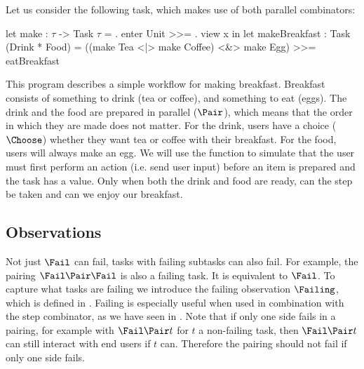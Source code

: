   Let us consider the following task, which makes use of both parallel combinators:
  \begin{TASK}
    let make : $\tau$ -> Task $\tau$ = \x. enter Unit >>= \y. view x in
    let makeBreakfast : Task (Drink * Food) =
      ((make Tea <|> make Coffee) <&> make Egg) >>= eatBreakfast
  \end{TASK}
  This program describes a simple workflow for making breakfast.
  Breakfast consists of something to drink (tea or coffee), and something to eat (eggs).
  The drink and the food are prepared in parallel ($\Pair$), which means that the order in which they are made does not matter.
  For the drink, users have a choice ($\Choose$) whether they want tea or coffee with their breakfast.
  For the food, users will always make an egg.
  We will use the function  to simulate that the user must first perform an action (i.e. send user input) before an item is prepared and the task has a value.
  Only when both the drink and food are ready, can the step be taken and can we enjoy our breakfast.
\stopexample


\subsection[sec:observations]{Observations}

Not just $\Fail$ can fail, tasks with failing subtasks can also fail.
For example, the pairing $\Fail \Pair \Fail$ is also a failing task.
It is equivalent to $\Fail$.
To capture what tasks are failing we introduce the failing observation $\Failing$, which is defined in .
Failing is especially useful when used in combination with the step combinator,
as we have seen in .
Note that if only one side fails in a pairing,
for example with $\Fail \Pair t$ for $t$ a non-failing task,
then $\Fail \Pair t$ can still interact with end users if $t$ can.
Therefore the pairing should not fail if only one side fails.


  {
    {}}



